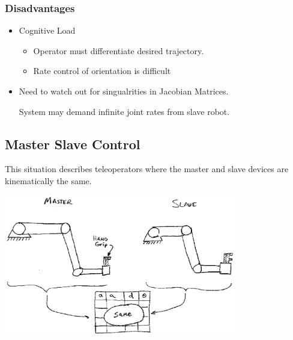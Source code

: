 

\subsubsection*{Disadvantages}
\begin{itemize}
   \item Cognitive Load
           \begin{itemize}
                 \item Operator must differentiate desired trajectory.
		 \item Rate control of orientation is difficult
            \end{itemize}
   \item Need to watch out for singualrities in Jacobian Matrices.

System may demand infinite joint rates from slave robot.
\end{itemize}






\subsection{Master Slave Control}

This situation describes teleoperators where the master and slave devices are kinematically the same.

\includegraphics[width=4.0in]{figs14/00401.eps}


